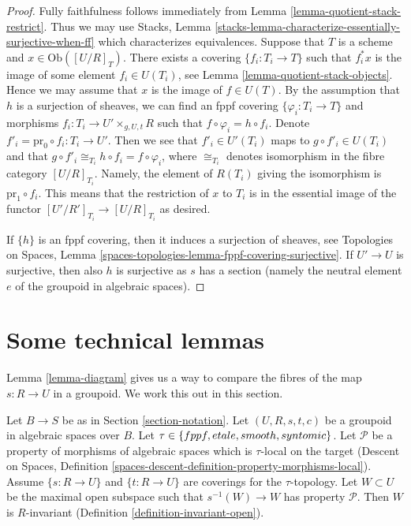 \begin{proof}
Fully faithfulness follows immediately from
Lemma \ref{lemma-quotient-stack-restrict}.
Thus we may use
Stacks, Lemma \ref{stacks-lemma-characterize-essentially-surjective-when-ff}
which characterizes equivalences.
Suppose that $T$ is a scheme and $x \in \text{Ob}([U/R]_T)$.
There exists a covering $\{f_i : T_i \to T\}$ such that $f_i^*x$
is the image of some element $f_i \in U(T_i)$, see
Lemma \ref{lemma-quotient-stack-objects}.
Hence we may assume that $x$ is the image of $f \in U(T)$.
By the assumption that $h$ is a surjection of sheaves, we
can find an fppf covering $\{\varphi_i : T_i \to T\}$ and morphisms
$f_i : T_i \to U' \times_{g, U, t} R$ such that
$f \circ \varphi_i = h \circ f_i$. Denote
$f'_i = \text{pr}_0 \circ f_i : T_i \to U'$. Then we see that
$f'_i \in U'(T_i)$ maps to $g \circ f'_i \in U(T_i)$ and
that $g \circ f'_i \cong_{T_i} h \circ f_i = f \circ \varphi_i$,
where $\cong_{T_i}$ denotes isomorphism in the fibre category
$[U/R]_{T_i}$. Namely, the element of $R(T_i)$ giving the isomorphism
is $\text{pr}_1 \circ f_i$. This means that the restriction
of $x$ to $T_i$ is in the essential image of the functor
$[U'/R']_{T_i} \to [U/R]_{T_i}$ as desired.

\medskip\noindent
If $\{h\}$ is an fppf covering, then it induces a surjection of sheaves, see
Topologies on Spaces,
Lemma \ref{spaces-topologies-lemma-fppf-covering-surjective}.
If $U' \to U$ is surjective, then also $h$ is surjective as $s$ has a section
(namely the neutral element $e$ of the groupoid in algebraic spaces).
\end{proof}












\section{Some technical lemmas}
\label{section-technical-lemma}

\noindent
Lemma \ref{lemma-diagram} gives us a way to compare the fibres of the map
$s : R \to U$ in a groupoid. We work this out in this section.

\begin{lemma}
\label{lemma-property-invariant}
Let $B \to S$ be as in Section \ref{section-notation}.
Let $(U, R, s, t, c)$ be a groupoid in algebraic spaces over $B$.
Let $\tau \in \{fppf, \linebreak[0] etale,\linebreak[0] smooth,\linebreak[0]
syntomic\}$. Let $\mathcal{P}$ be a property of morphisms of algebraic spaces
which is $\tau$-local on the target
(Descent on Spaces,
Definition \ref{spaces-descent-definition-property-morphisms-local}).
Assume $\{s : R \to U\}$ and $\{t : R \to U\}$ are coverings for the
$\tau$-topology. Let $W \subset U$ be the maximal open subspace such that
$s^{-1}(W) \to W$ has property $\mathcal{P}$.
Then $W$ is $R$-invariant (Definition \ref{definition-invariant-open}).
\end{lemma}

